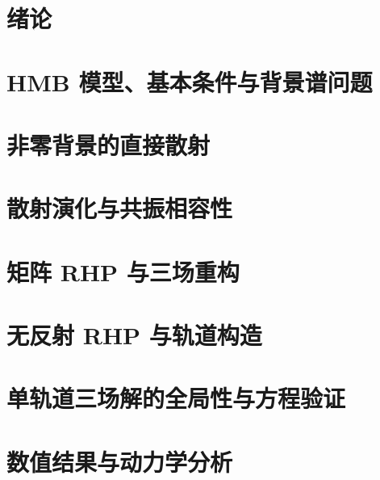 \documentclass[type=master,oneside]{fduthesis}
\begin{document}
\raggedbottom
\fancyhead[R]{}
\frontmatter

\begingroup
\linespread{1.15}\selectfont
\tableofcontents
\endgroup
\mainmatter
\section{绪论}\label{ch:intro}

\section{HMB 模型、基本条件与背景谱问题}\label{ch:model}

\section{非零背景的直接散射}\label{ch:direct}

\section{散射演化与共振相容性}\label{ch:scattering}

\section{矩阵 RHP 与三场重构}\label{ch:rhp}

\section{无反射 RHP 与轨道构造}\label{ch:soliton}

\section{单轨道三场解的全局性与方程验证}\label{ch:verification}

\section{数值结果与动力学分析}\label{ch:conclusion}

\FloatBarrier

\backmatter
\begingroup
\linespread{1.2}\selectfont
\setlength{\bibsep}{2pt}

\endgroup
\end{document}
